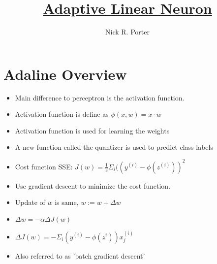 \documentclass[11pt]{article}
\title{\textbf{\underline{Adaptive Linear Neuron}}}
\author{Nick R. Porter}
\begin{document}
\maketitle

\section{Adaline Overview}

	\begin{itemize}
		\item Main difference to perceptron is the activation function.
		\item Activation function is define as $\phi(x,w) = x \cdot w$
		\item Activation function is used for learning the weights
		\item A new function called the quantizer is used to predict class labels
		\item Cost function SSE: $J(w) = \frac{1}{2} \Sigma_i ( (y^{(i)} - \phi(z^{(i)}))^2$
		\item Use gradient descent to minimize the cost function.
		\item Update of $w$ is same, $w := w + \Delta w$
		\item $\Delta w = -\alpha \Delta J(w)$
		\item $\Delta J(w) = - \Sigma_i (y^{(i)} - \phi(z^{i}))x^{(i)}_{j}$
		\item Also referred to as 'batch gradient descent'
	\end{itemize}
	
\end{document}
